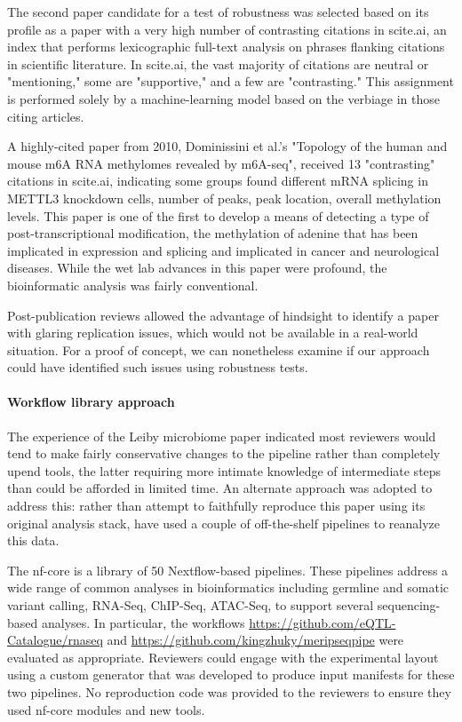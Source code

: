 \documentclass{drexelthesis}
\begin{document}
The second paper candidate for a test of robustness was selected based on its profile as a paper with a very high number of contrasting citations in scite.ai, an index that performs lexicographic full-text analysis on phrases flanking citations in scientific literature. In scite.ai, the vast majority of citations are neutral or "mentioning," some are "supportive," and a few are "contrasting." This assignment is performed solely by a machine-learning model based on the verbiage in those citing articles.

A highly-cited paper from 2010, Dominissini et al.'s "Topology of the human and mouse m6A RNA methylomes revealed by m6A-seq", received 13 "contrasting" citations in scite.ai, indicating some groups found different mRNA splicing in METTL3 knockdown cells, number of peaks, peak location, overall methylation levels. This paper is one of the first to develop a means of detecting a type of post-transcriptional modification, the methylation of adenine that has been implicated in expression and splicing and implicated in cancer and neurological diseases. While the wet lab advances in this paper were profound, the bioinformatic analysis was fairly conventional.

Post-publication reviews allowed the advantage of hindsight to identify a paper with glaring replication issues, which would not be available in a real-world situation. For a proof of concept, we can nonetheless examine if our approach could have identified such issues using robustness tests.

\paragraph{Workflow library approach}

The experience of the Leiby microbiome paper indicated most reviewers would tend to make fairly conservative changes to the pipeline rather than completely upend tools, the latter requiring more intimate knowledge of intermediate steps than could be afforded in limited time. An alternate approach was adopted to address this: rather than attempt to faithfully reproduce this paper using its original analysis stack, have used a couple of off-the-shelf pipelines to reanalyze this data.

The nf-core is a library of 50 Nextflow-based pipelines. These pipelines address a wide range of common analyses in bioinformatics including germline and somatic variant calling, RNA-Seq, ChIP-Seq, ATAC-Seq, to support several sequencing-based analyses. In particular, the workflows \url{https://github.com/eQTL-Catalogue/rnaseq} and \url{https://github.com/kingzhuky/meripseqpipe} were evaluated as appropriate. Reviewers could engage with the experimental layout using a custom generator that was developed to produce input manifests for these two pipelines. No reproduction code was provided to the reviewers to ensure they used nf-core modules and new tools.
\end{document}
